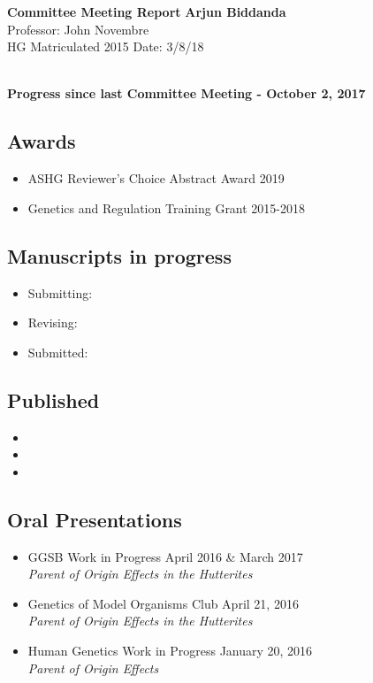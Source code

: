 \documentclass[a4paper, 11pt]{article}
\begin{document}
\noindent
\large\textbf{Committee Meeting Report} \hfill \textbf{Arjun Biddanda} \\
\normalsize  \hfill Professor: John Novembre  \\
HG Matriculated 2015 \hfill Date: 3/8/18 \\
\noindent\makebox[\linewidth]{\rule{\paperwidth}{0.4pt}}

\large\textbf{\\Progress since last Committee Meeting - October 2, 2017}
\subsection*{Awards}
\begin{itemize}
    \item ASHG Reviewer's Choice Abstract Award  \hfill 2019 
    \item Genetics and Regulation Training Grant \hfill 2015-2018
\end{itemize} 

\subsection*{Manuscripts in progress}
\begin{itemize}
    \item Submitting: 
    \item Revising: 
    \item Submitted: 
\end{itemize}

\subsection*{Published}
\begin{itemize}
    \item {}
    \item {}
    \item {}
\end{itemize}

\subsection*{Oral Presentations}
\begin{itemize}
	\item GGSB Work in Progress \hfill April 2016 \& March 2017\\ \emph{Parent of Origin Effects in the Hutterites}
	\item Genetics of Model Organisms Club \hfill April 21, 2016\\  \emph{Parent of Origin Effects in the Hutterites}
	\item Human Genetics Work in Progress \hfill January 20, 2016\\ \emph{Parent of Origin Effects} 
\end{itemize}
\end{document}
